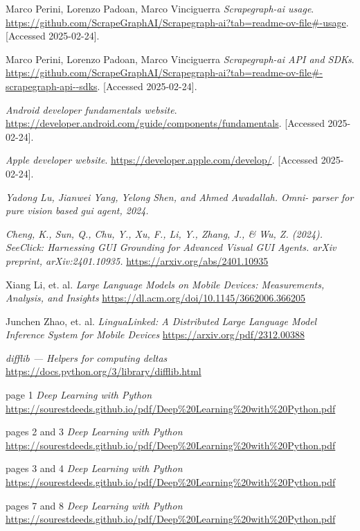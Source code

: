 \documentclass[licencjacka,en]{pracamgr}
\begin{document}
\begin{thebibliography}{199}
Marco Perini, Lorenzo Padoan, Marco Vinciguerra
\textit{Scrapegraph-ai usage}.
\url{https://github.com/ScrapeGraphAI/Scrapegraph-ai?tab=readme-ov-file#-usage}.
[Accessed 2025-02-24].

Marco Perini, Lorenzo Padoan, Marco Vinciguerra
\textit{Scrapegraph-ai API and SDKs}.
\url{https://github.com/ScrapeGraphAI/Scrapegraph-ai?tab=readme-ov-file#-scrapegraph-api--sdks}.
[Accessed 2025-02-24].

\textit{Android developer fundamentals website}.
\url{https://developer.android.com/guide/components/fundamentals}.
[Accessed 2025-02-24].

\textit{Apple developer website}.
\url{https://developer.apple.com/develop/}.
[Accessed 2025-02-24].

\textit{Yadong Lu, Jianwei Yang, Yelong Shen, and Ahmed Awadallah. Omni-
parser for pure vision based gui agent, 2024.}

\textit{Cheng, K., Sun, Q., Chu, Y., Xu, F., Li, Y., Zhang, J., \& Wu, Z. (2024). SeeClick: Harnessing GUI Grounding for Advanced Visual GUI Agents. arXiv preprint, arXiv:2401.10935.} \url{https://arxiv.org/abs/2401.10935}

Xiang Li, et. al.
\textit{Large Language Models on Mobile Devices: Measurements, Analysis, and Insights}
\url{https://dl.acm.org/doi/10.1145/3662006.366205}

Junchen Zhao, et. al.
\textit{LinguaLinked: A Distributed Large Language Model Inference System for Mobile Devices}
\url{https://arxiv.org/pdf/2312.00388}

\textit{difflib — Helpers for computing deltas}
\url{https://docs.python.org/3/library/difflib.html}

page 1
\textit{Deep Learning with Python}
\url{https://sourestdeeds.github.io/pdf/Deep%20Learning%20with%20Python.pdf}

pages 2 and 3
\textit{Deep Learning with Python}
\url{https://sourestdeeds.github.io/pdf/Deep%20Learning%20with%20Python.pdf}

pages 3 and 4
\textit{Deep Learning with Python}
\url{https://sourestdeeds.github.io/pdf/Deep%20Learning%20with%20Python.pdf}

pages 7 and 8
\textit{Deep Learning with Python}
\url{https://sourestdeeds.github.io/pdf/Deep%20Learning%20with%20Python.pdf}


\end{thebibliography}
\end{document}
